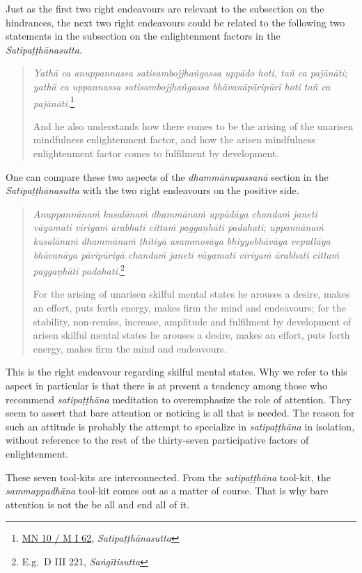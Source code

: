 Just as the first two right endeavours are relevant to the subsection on the hindrances, the next two right endeavours could be related to the following two statements in the subsection on the enlightenment factors in the \emph{Satipaṭṭhānasutta}.

\begin{quote}
\emph{Yathā ca anuppannassa satisambojjhaṅgassa uppādo hoti, tañ ca pajānāti; yathā ca uppannassa satisambojjhaṅgassa bhāvanāpāripūrī hoti tañ ca pajānāti.}\footnote{\href{https://suttacentral.net/mn10/pli/ms}{MN 10 / M I 62}, \emph{Satipaṭṭhānasutta}}

And he also understands how there comes to be the arising of the unarisen mindfulness enlightenment factor, and how the arisen mindfulness enlightenment factor comes to fulfilment by development.
\end{quote}

One can compare these two aspects of the \emph{dhammānupassanā} section in the \emph{Satipaṭṭhānasutta} with the two right endeavours on the positive side.

\begin{quote}
\emph{Anuppannānaṁ kusalānaṁ dhammānaṁ uppādāya chandaṁ janeti vāyamati viriyaṁ ārabhati cittaṁ paggaṇhāti padahati; uppannānaṁ kusalānaṁ dhammānaṁ ṭhitiyā asammosāya bhiyyobhāvāya vepullāya bhāvanāya pāripūriyā chandaṁ janeti vāyamati viriyaṁ ārabhati cittaṁ paggaṇhāti padahati.}\footnote{E.g.~D III 221, \emph{Saṅgītisutta}}

For the arising of unarisen skilful mental states he arouses a desire, makes an effort, puts forth energy, makes firm the mind and endeavours; for the stability, non-remiss, increase, amplitude and fulfilment by development of arisen skilful mental states he arouses a desire, makes an effort, puts forth energy, makes firm the mind and endeavours.
\end{quote}

This is the right endeavour regarding skilful mental states. Why we refer to this aspect in particular is that there is at present a tendency among those who recommend \emph{satipaṭṭhāna} meditation to overemphasize the role of attention. They seem to assert that bare attention or noticing is all that is needed. The reason for such an attitude is probably the attempt to specialize in \emph{satipaṭṭhāna} in isolation, without reference to the rest of the thirty-seven participative factors of enlightenment.

These seven tool-kits are interconnected. From the \emph{satipaṭṭhāna} tool-kit, the \emph{sammappadhāna} tool-kit comes out as a matter of course. That is why bare attention is not the be all and end all of it.

